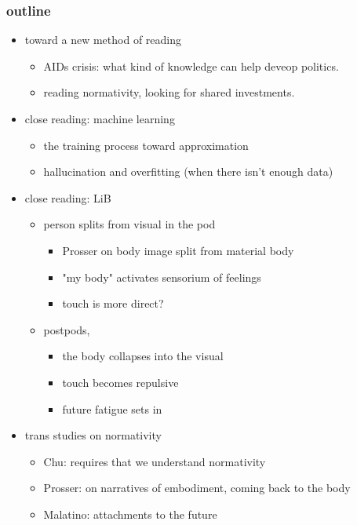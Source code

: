 \documentclass[11pt]{article}
\begin{document}
\subsubsection{outline}
\label{sec:org7af2136}
\begin{itemize}
\item toward a new method of reading
\begin{itemize}
\item AIDs crisis: what kind of knowledge can help deveop politics.
\item reading normativity, looking for shared investments.
\end{itemize}
\item close reading: machine learning
\begin{itemize}
\item the training process toward approximation
\item hallucination and overfitting (when there isn't enough data)
\end{itemize}
\item close reading: LiB
\begin{itemize}
\item person splits from visual in the pod
\begin{itemize}
\item Prosser on body image split from material body
\item "my body" activates sensorium of feelings
\item touch is more direct?
\end{itemize}
\item postpods,
\begin{itemize}
\item the body collapses into the visual
\item touch becomes repulsive
\item future fatigue sets in
\end{itemize}
\end{itemize}
\item trans studies on normativity
\begin{itemize}
\item Chu: requires that we understand normativity
\item Prosser: on narratives of embodiment, coming back to the body
\item Malatino: attachments to the future
\end{itemize}
\end{itemize}
\end{document}
